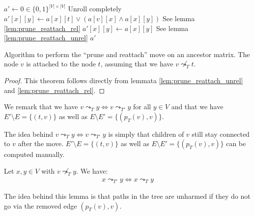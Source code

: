\begin{algorithm}
    \begin{algorithmic}[1]
            \State $a' \leftarrow 0 \in \{0,1\}^{|V| \times |V|}$
                 \Comment Unroll completely
                        \State $a'[x][y] \leftarrow a[x][t] \vee (a[v][x] \wedge a[x][y])$ \Comment See lemma \ref{lem:prune_reattach_rel}
                    \Else
                        \State $a'[x][y] \leftarrow a[x][y]$ \Comment See lemma \ref{lem:prune_reattach_unrel}
                    \EndIf
                \EndFor
            \EndFor
            \State \Return $a'$
        \EndFunction
    \end{algorithmic}
    \caption{Algorithm to perform the ``prune and reattach'' move on an ancestor matrix. The node $v$ is attached to the node $t$, assuming that we have $v \not\leadsto_T t$.}
    \label{alg:am_prune_reattach}
\end{algorithm}

\begin{proof}
    This theorem follows directly from lemmata \ref{lem:prune_reattach_unrel} and \ref{lem:prune_reattach_rel}.
\end{proof}

\begin{remark}
    \label{rem:prune_reattach}
    We remark that we have $v \leadsto_T y \Leftrightarrow v \leadsto_{T'} y$ for all $y \in V$ and that we have $E' \setminus E = \{(t,v)\}$ as well as $E \setminus E' = \{(p_T(v), v)\}$.
\end{remark}

The idea behind $v \leadsto_T y \Leftrightarrow v \leadsto_{T'} y$ is simply that children of $v$ still stay connected to $v$ after the move. $E' \setminus E = \{(t,v)\}$ as well as $E \setminus E' = \{(p_T(v), v)\}$ can be computed manually.

\begin{lemma}
    \label{lem:prune_reattach_unrel}
    Let $x, y \in V$ with $v \not\leadsto_T y$. We have:
    \begin{align*}
        x \leadsto_{T'} y \Leftrightarrow x \leadsto_T y
    \end{align*}
\end{lemma}

The idea behind this lemma is that paths in the tree are unharmed if they do not go via the removed edge $(p_T(v), v)$.

